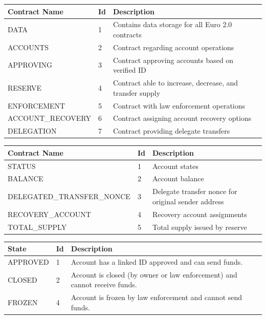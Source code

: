 \documentclass[a4paper,12pt]{article} %
\begin{document}
{{\begin{center}
\begin{tabular}{ | l | l | p{10cm} | }
 \hline
 Contract Name & Id & Description
 \\ \hline\hline
 DATA & 1 & Contains data storage for all Euro 2.0 contracts
 \\ \hline
 ACCOUNTS & 2 & Contract regarding account operations
 \\ \hline
 APPROVING & 3 & Contract approving accounts based on verified ID
 \\ \hline
 RESERVE & 4 & Contract able to increase, decrease, and transfer supply
 \\ \hline
 ENFORCEMENT & 5 & Contract with law enforcement operations
 \\ \hline
 ACCOUNT\_RECOVERY & 6 & Contract assigning account recovery options
 \\ \hline
 DELEGATION & 7 & Contract providing delegate transfers
 \\ \hline
\end{tabular}
\end{center}
\label{tab:constantSubcontractIds}

\begin{center}
\begin{tabular}{ | l | l | p{8cm} | }
 \hline
 Contract Name & Id & Description
 \\ \hline\hline
 STATUS & 1 & Account states
 \\ \hline
 BALANCE & 2 & Account balance
 \\ \hline
 DELEGATED\_TRANSFER\_NONCE & 3 & Delegate transfer nonce for original sender address
 \\ \hline
 RECOVERY\_ACCOUNT & 4 & Recovery account assignments
 \\ \hline
 TOTAL\_SUPPLY & 5 & Total supply issued by reserve
 \\ \hline
\end{tabular}
\end{center}
\label{tab:constantBucketIds}

\begin{center}
\begin{tabular}{ | l | l | p{10cm} | }
 \hline
 State & Id & Description
 \\ \hline\hline
 APPROVED & 1 & Account has a linked ID approved and can send funds.
 \\ \hline
 CLOSED & 2 & Account is closed (by owner or law enforcement) and cannot receive funds.
 \\ \hline
 FROZEN & 4 & Account is frozen by law enforcement and cannot send funds.
 \\ \hline
\end{tabular}
\end{center}
\label{tab:constantAccountStates}

}}
\end{document}
